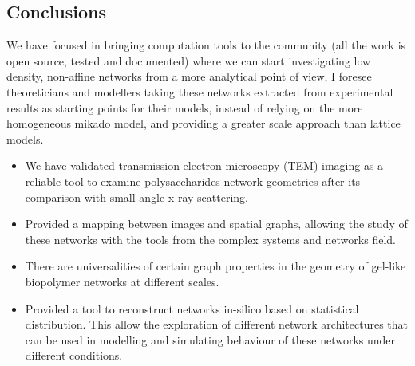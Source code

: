 \subsection{Conclusions}%
\label{sub:conclusions}

We have focused in bringing computation tools to the community (all the work is open source, tested and documented) where we can start investigating low density, non-affine networks from a more analytical point of view, I foresee theoreticians and modellers taking these networks extracted from experimental results as starting points for their models, instead of relying on the more homogeneous mikado model, and providing a greater scale approach than lattice models.

\begin{itemize}[topsep=0pt]
  \item We have validated transmission electron microscopy (TEM) imaging as a reliable tool to examine polysaccharides network geometries after its comparison with small-angle x-ray scattering.
  \item Provided a mapping between images and spatial graphs, allowing the study of these networks with the tools from the complex systems and networks field.
  \item There are universalities of certain graph properties in the geometry of gel-like biopolymer networks at different scales.
  \item Provided a tool to reconstruct networks in-silico based on statistical distribution. This allow the exploration of different network architectures that can be used in modelling and simulating behaviour of these networks under different conditions.
\end{itemize}

